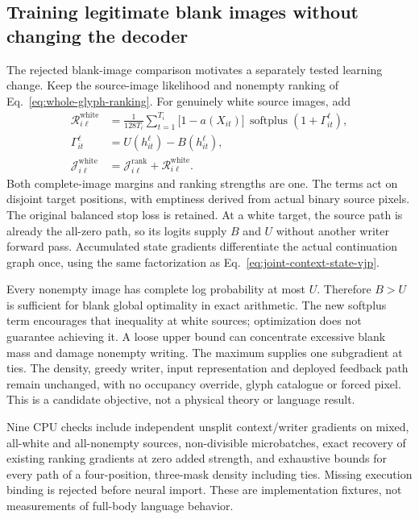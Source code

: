 \subsection*{Training legitimate blank images without changing the decoder}

The rejected blank-image comparison motivates a separately tested learning
change. Keep the source-image likelihood and nonempty ranking of
Eq.~\ref{eq:whole-glyph-ranking}. For genuinely white source images, add
\begin{equation}
 \begin{aligned}
 \mathcal R^{\mathrm{white}}_{i\ell}
 &=\frac1{128T_i}\sum_{t=1}^{T_i}\bigl[1-a(X_{it})\bigr]\,
    \operatorname{softplus}\!\left(1+\Gamma_{it}^{\ell}\right),\\
 \Gamma_{it}^{\ell}
 &=U(h_{it}^{\ell})-B(h_{it}^{\ell}),\\
 \mathcal J^{\mathrm{white}}_{i\ell}
 &=\mathcal J^{\mathrm{rank}}_{i\ell}+\mathcal R^{\mathrm{white}}_{i\ell}.
 \end{aligned}
 \label{eq:white-target-ranking}
\end{equation}
Both complete-image margins and ranking strengths are one. The terms act on
disjoint target positions, with emptiness derived from actual binary source
pixels. The original balanced stop loss is retained. At a white target, the
source path is already the all-zero path, so its logits supply $B$ and $U$
without another writer forward pass. Accumulated state gradients differentiate
the actual continuation graph once, using the same factorization as
Eq.~\ref{eq:joint-context-state-vjp}.

Every nonempty image has complete log probability at most $U$. Therefore
$B>U$ is sufficient for blank global optimality in exact arithmetic. The new
softplus term encourages that inequality at white sources; optimization does
not guarantee achieving it. A loose upper bound can concentrate excessive
blank mass and damage nonempty writing. The maximum supplies one subgradient
at ties. The density, greedy writer, input representation and deployed feedback
path remain unchanged, with no occupancy override, glyph catalogue or forced
pixel. This is a candidate objective, not a physical theory or language result.

Nine CPU checks include independent unsplit context/writer gradients on mixed,
all-white and all-nonempty sources, non-divisible microbatches, exact recovery
of existing ranking gradients at zero added strength, and exhaustive bounds
for every path of a four-position, three-mask density including ties. Missing
execution binding is rejected before neural import. These are implementation
fixtures, not measurements of full-body language behavior.

